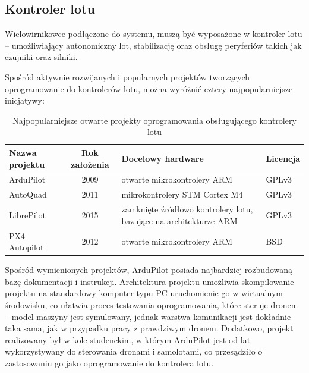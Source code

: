 \subsection{Kontroler lotu}

Wielowirnikowce podłączone do systemu, muszą być
wyposażone w kontroler lotu -- umożliwiający
autonomiczny lot, stabilizację oraz obsługę 
peryferiów takich jak czujniki oraz silniki.

Spośród aktywnie rozwijanych i popularnych
projektów \cite{autopilots_sourvey} tworzących oprogramowanie do kontrolerów
lotu, można wyróżnić cztery najpopularniejsze inicjatywy: 

\begin{table}[htb]
	\centering\small
	\caption{
		Najpopularniejsze otwarte projekty
		oprogramowania obsługującego kontrolery lotu
	}
	\label{flight_controllers_comparison}

	\begin{tabularx}{0.87\textwidth}
	{ 
	| >{\raggedright\arraybackslash}l 
	| c 
	| >{\raggedright\arraybackslash}X
	| >{\raggedleft\arraybackslash}l |
	}
	\hline
	\textbf{Nazwa projektu} & \textbf{Rok założenia} &
	\textbf{Docelowy hardware}
	&  \textbf{Licencja}
	\\\hline
	ArduPilot\cite{ardupilot_home_page}		&  2009	& otwarte mikrokontrolery ARM & GPLv3
	\\ \hline
	AutoQuad\cite{autoquad_timeline}		&  2011	& mikrokontrolery STM Cortex M4		 & GPLv3
	\\ \hline
	LibrePilot\cite{librepilot_home_page}	&  2015	& zamknięte źródłowo kontrolery lotu, bazujące na architekturze ARM & GPLv3
	\\ \hline       
	PX4 Autopilot\cite{px4_home_page}		&  2012	& otwarte mikrokontrolery ARM & BSD
	\\ \hline       
	\end{tabularx}
	
\end{table}

Spośród wymienionych projektów, ArduPilot posiada najbardziej rozbudowaną bazę 
dokumentacji i instrukcji. Architektura projektu umożliwia skompilowanie projektu
na standardowy komputer typu PC uruchomienie go w wirtualnym
środowisku\cite{ardupilot_sitl}, co ułatwia proces testowania oprogramowania,
które steruje dronem -- model maszyny jest symulowany, jednak warstwa komunikacji
jest dokładnie taka sama, jak w przypadku pracy z prawdziwym dronem. Dodatkowo, projekt
realizowany był w kole studenckim, w którym ArduPilot jest od lat wykorzystywany
do sterowania dronami i samolotami, co przesądziło o zastosowaniu go jako
oprogramowanie do kontrolera lotu.

